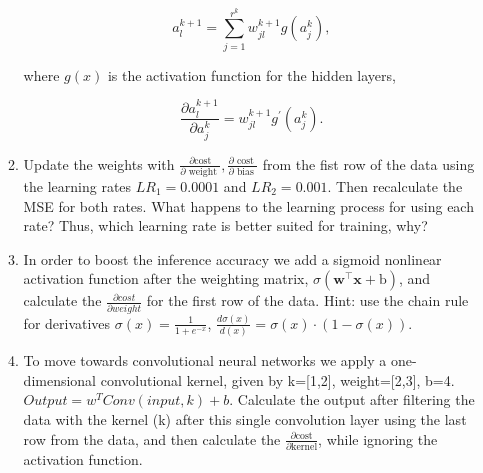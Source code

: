 \documentclass[main.tex]{subfiles}
\begin{document}
\begin{enumerate}
\begin{enumerate}
        $$a_{l}^{k+1}=\sum_{j=1}^{r^{k}} w_{j l}^{k+1} g\left(a_{j}^{k}\right),$$
        
        where $g(x)$ is the activation function for the hidden layers,
        
        $$\frac{\partial a_{l}^{k+1}}{\partial a_{j}^{k}}=w_{j l}^{k+1} g^{\prime}\left(a_{j}^{k}\right).$$
        
        
    
        \item Update the weights with $\frac{\partial \text{cost}}{\partial \text { weight }}, \frac{\partial \text { cost }}{\partial \text { bias }}$ from the fist row of the data using the learning rates $LR_1 = 0.0001$ and $LR_2 = 0.001$. Then recalculate the MSE for both rates. What happens to the learning process for using each rate? Thus, which learning rate is better suited for training, why? 
        
        \item In order to boost the inference accuracy we add a sigmoid nonlinear activation function after the weighting matrix, $\sigma\left(\boldsymbol{w}^{\top} \boldsymbol{x}+\mathrm{b}\right)$, and calculate the $\frac{\partial cost}{\partial weight}$ for the first row of the data. Hint: use the chain rule for derivatives $\sigma(x)=\frac{1}{1+e^{-x}}$, $\frac{d \sigma(x)}{d(x)}=\sigma(x) \cdot(1-\sigma(x))$.
        
        \item To move towards convolutional neural networks we apply a one-dimensional convolutional kernel, given by k=[1,2], weight=[2,3], b=4. $Output = w^T Conv(input,k)+b$. Calculate the output after filtering the data with the kernel (k) after this single convolution layer using the last row from the data, and then calculate the $\frac{\partial \text{cost}}{\partial \text{kernel}}$, while ignoring the activation function.
        
        \end{enumerate}
\end{enumerate}
\end{document}
